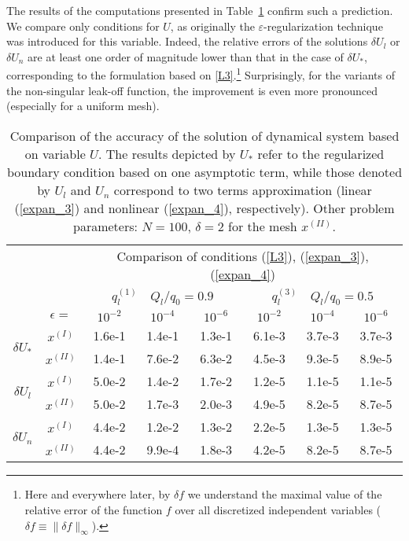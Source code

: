 The results of the computations presented in
Table~\ref{table_UUU} confirm such a prediction. We compare only conditions for $U$, as originally the $\varepsilon$-regularization technique was introduced for this variable.  Indeed, the relative errors
of the solutions $\delta U_l$ or $\delta U_n$ are at least one
order of magnitude lower than that in the case of $\delta U_*$,
corresponding to the formulation based on \eqref{L3}.\footnote{
Here and everywhere later, by $\delta f$ we understand the maximal value of the relative
error of the function $f$ over all discretized independent variables ($\delta f\equiv \|\delta f\|_\infty$).}
Surprisingly, for the variants of the non-singular leak-off function, the improvement
is even more pronounced (especially for a uniform mesh).



\begin{table}
\centering
\begin{tabular}{c c|c@{}|c@{}|c@{}|c@{}|c@{}|c@{}|}
\cline{3-8}
& & \multicolumn{6}{c|}{Comparison of conditions (\ref{L3}), (\ref{expan_3}), (\ref{expan_4})}\\ \cline{3-8}
\cline{3-8}
& & \multicolumn{3}{c|}{$q_l^{(1)} \quad Q_l/q_0=0.9$} & \multicolumn{3}{c|}{$q_l^{(3)} \quad Q_l/q_0=0.5$} \\ \cline{2-8}
& \multicolumn{1}{|c|}{$\epsilon=$} & $10^{-2}$ & $10^{-4}$  & $10^{-6}$ &  $10^{-2}$ &  $10^{-4}$ &  $10^{-6}$ \\ \cline{1-8}
\multicolumn{1}{|c}{\multirow{2}{*}{$\delta U_*$}} & \multicolumn{1}{|c|}{$x^{(I)}$}
 &1.6e-1&1.4e-1&1.3e-1&6.1e-3&3.7e-3&3.7e-3
 \\ \cline{2-8} \multicolumn{1}{|c}{} & \multicolumn{1}{|c|}{$x^{(II)}$}
&1.4e-1&7.6e-2&6.3e-2&4.5e-3&9.3e-5&8.9e-5
 \\ \cline{1-8}
\multicolumn{1}{|c}{\multirow{2}{*}{$\delta U_l$}} & \multicolumn{1}{|c|}{$x^{(I)}$}
 &5.0e-2&1.4e-2&1.7e-2&1.2e-5&1.1e-5&1.1e-5
 \\ \cline{2-8} \multicolumn{1}{|c}{} & \multicolumn{1}{|c|}{$x^{(II)}$}
&5.0e-2&1.7e-3&2.0e-3&4.9e-5&8.2e-5&8.7e-5
 \\ \cline{1-8}
\multicolumn{1}{|c}{\multirow{2}{*}{$\delta U_n$}} & \multicolumn{1}{|c|}{$x^{(I)}$}
 &4.4e-2&1.2e-2&1.3e-2&2.2e-5&1.3e-5&1.3e-5
 \\ \cline{2-8} \multicolumn{1}{|c}{} & \multicolumn{1}{|c|}{$x^{(II)}$}
&4.4e-2&9.9e-4&1.8e-3&4.2e-5&8.2e-5&8.7e-5
 \\ \cline{1-8}
\end{tabular}
\caption{Comparison of the accuracy of the solution of dynamical system based on variable $U$.
The results depicted by $U_*$ refer to the regularized boundary condition  based on one asymptotic term, while those denoted by $U_l$ and $U_n$
correspond to two terms approximation (linear (\ref{expan_3}) and nonlinear (\ref{expan_4}), respectively).
Other problem parameters: $N=100$, $\delta=2$ for the mesh $x^{(II)}$.}
\label{table_UUU}
\end{table}

